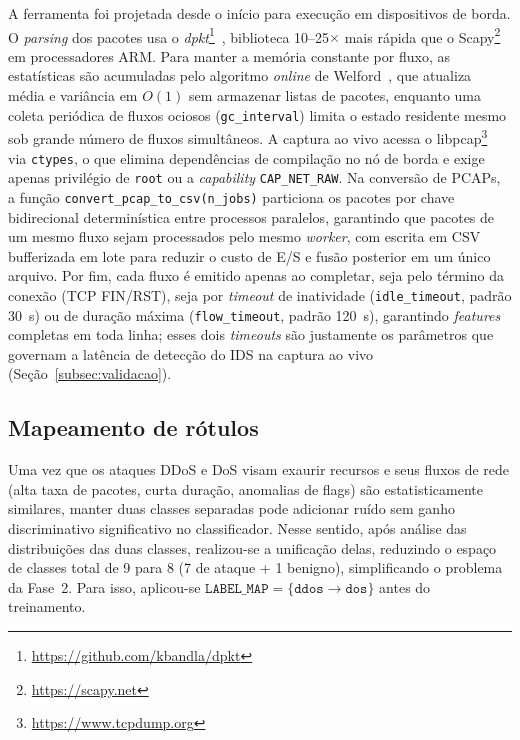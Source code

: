 \documentclass[12pt]{article}
\begin{document}
A ferramenta foi projetada desde o início para execução em dispositivos de
borda. O \textit{parsing} dos pacotes usa o
\textit{dpkt}\footnote{\url{https://github.com/kbandla/dpkt}}~\cite{dpkt},
biblioteca 10--25$\times$ mais rápida que o
Scapy\footnote{\url{https://scapy.net}}~\cite{scapy} em processadores ARM. Para
manter a memória constante por fluxo, as estatísticas são acumuladas pelo
algoritmo \textit{online} de Welford~\cite{welford}, que atualiza média e
variância em $O(1)$ sem armazenar listas de pacotes, enquanto uma coleta
periódica de fluxos ociosos (\texttt{gc\_interval}) limita o estado residente
mesmo sob grande número de fluxos simultâneos. A captura ao vivo acessa o
libpcap\footnote{\url{https://www.tcpdump.org}}~\cite{libpcap} via
\texttt{ctypes}, o que elimina dependências de compilação no nó de borda e exige
apenas privilégio de \texttt{root} ou a \textit{capability}
\texttt{CAP\_NET\_RAW}. Na conversão de PCAPs, a função
\texttt{convert\_pcap\_to\_csv(n\_jobs)} particiona os pacotes por chave
bidirecional determinística entre processos paralelos, garantindo que pacotes de
um mesmo fluxo sejam processados pelo mesmo \textit{worker}, com escrita em CSV
bufferizada em lote para reduzir o custo de E/S e fusão posterior em um único
arquivo. Por fim, cada fluxo é emitido apenas ao completar, seja pelo término da
conexão (TCP FIN/RST), seja por \textit{timeout} de inatividade
(\texttt{idle\_timeout}, padrão 30~s) ou de duração máxima
(\texttt{flow\_timeout}, padrão 120~s), garantindo \textit{features} completas
em toda linha; esses dois \textit{timeouts} são justamente os parâmetros que
governam a latência de detecção do IDS na captura ao vivo
(Seção~\ref{subsec:validacao}).

\subsection{Mapeamento de rótulos}
\label{subsec:rotulos}

Uma vez que os ataques DDoS e DoS visam exaurir recursos e seus fluxos de rede (alta taxa de pacotes, curta duração, anomalias de flags) são estatisticamente similares, manter duas classes separadas pode adicionar ruído sem ganho discriminativo significativo no classificador. Nesse sentido, após análise das distribuições das duas classes, realizou-se a unificação delas, reduzindo o espaço de classes total de 9 para 8 (7 de ataque + 1 benigno), simplificando o problema da Fase~2. Para isso, aplicou-se $\texttt{LABEL\_MAP} = \{\texttt{ddos} \rightarrow \texttt{dos}\}$ antes do treinamento.   
\end{document}
